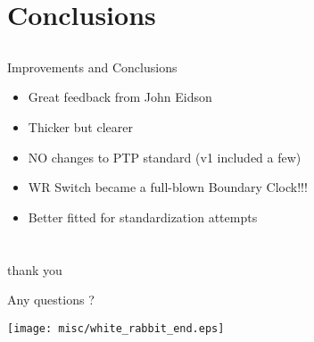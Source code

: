 \documentclass[compress,red]{beamer}
\begin{document}
\section{Conclusions}
\subsection{}
\begin{frame}{Improvements and Conclusions}

\begin{itemize}
  \item Great feedback from John Eidson
  \item Thicker but clearer
  \item NO changes to PTP standard (v1 included a few)
  \item WR Switch became a full-blown Boundary Clock!!!
  \item Better fitted for standardization attempts
\end{itemize}

\end{frame}
\section{}
\begin{frame}{thank you}

    \begin{center}
    Any questions ?
    \end{center}

    
    \begin{center}
    \texttt{[image: misc/white\_rabbit\_end.eps]}
    \end{center}

\end{frame}
\end{document}
